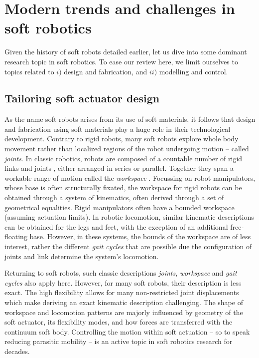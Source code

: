 \clearpage
\section{Modern trends and challenges in soft robotics}
Given the history of soft robots detailed earlier, let us dive into some dominant research topic in soft robotics. To ease our review here, we limit ourselves to topics related to $i)$ design and fabrication, and $ii)$ modelling and control.

\subsection{Tailoring soft actuator design}
As the name soft robots arises from its use of soft materials, it follows that design and fabrication using soft materials play a huge role in their technological development. Contrary to rigid robots, many soft robots explore whole body movement rather than localized regions of the robot undergoing motion -- called \textit{joints}. In classic robotics, robots are composed of a countable number of rigid links and joints \cite{Spong2006,Murray1994,Corke2011}, either arranged in series or parallel. Together they span a workable range of motion called the \textit{workspace} \cite{Spong2006}. Focussing on robot manipulators, whose base is often structurally fixated, the workspace for rigid robots can be obtained through a system of kinematics, often derived through a set of geometrical equalities. Rigid manipulators often have a bounded workspace (assuming actuation limits). In robotic locomotion, similar kinematic descriptions can be obtained for the legs and feet, with the exception of an additional free-floating base. However, in these systems, the bounds of the workspace are of less interest, rather the different \textit{gait cycles} that are possible due the configuration of joints and link determine the system's locomotion. 

Returning to soft robots, such classic descriptions \textit{joints}, \textit{workspace} and \textit{gait cycles} also apply here. However, for many soft robots, their description is less exact. The high flexibility allows for many non-restricted joint displacements which make deriving an exact kinematic description challenging. The shape of workspace and locomotion patterns are majorly influenced by geometry of the soft actuator, its flexibility modes, and how forces are transferred with the continuum soft body. Controlling the motion within soft actuation -- so to speak reducing parasitic mobility -- is an active topic in soft robotics research for decades. 

